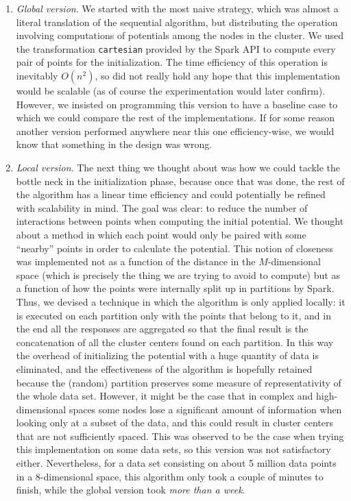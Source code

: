 \begin{enumerate}[1.]
\item \textit{Global version}. We started with the most naive strategy, which was almost a literal translation of the sequential algorithm, but distributing the operation involving computations of potentials among the nodes in the cluster. We used the transformation \verb|cartesian| provided by the Spark API to compute every pair of points for the initialization. The time efficiency of this operation is inevitably $O(n^2)$, so did not really hold any hope that this implementation would be scalable (as of course the experimentation would later confirm). However, we insisted on programming this version to have a baseline case to which we could compare the rest of the implementations. If for some reason another version performed anywhere near this one efficiency-wise, we would know that something in the design was wrong.
\item \textit{Local version}. The next thing we thought about was how we could tackle the bottle neck in the initialization phase, because once that was done, the rest of the algorithm has a linear time efficiency and could potentially be refined with scalability in mind. The goal was clear: to reduce the number of interactions between points when computing the initial potential. We thought about a method in which each point would only be paired with some ``nearby'' points in order to calculate the potential. This notion of closeness was implemented not as a function of the distance in the $M$-dimensional space (which is precisely the thing we are trying to avoid to compute) but as a function of how the points were internally split up in partitions by Spark. Thus, we devised a technique in which the algorithm is only applied locally: it is executed on each partition only with the points that belong to it, and in the end all the responses are aggregated so that the final result is the concatenation of all the cluster centers found on each partition. In this way the overhead of initializing the potential with a huge quantity of data is eliminated, and the effectiveness of the algorithm is hopefully retained because the (random) partition preserves some measure of representativity of the whole data set. However, it might be the case that in complex and high-dimensional spaces some nodes lose a significant amount of information when looking only at a subset of the data, and this could result in cluster centers that are not sufficiently spaced. This was observed to be the case when trying this implementation on some data sets, so this version was not satisfactory either. Nevertheless, for a data set consisting on about 5 million data points in a 8-dimensional space, this algorithm only took a couple of minutes to finish, while the global version took \textit{more than a week}.

\end{enumerate}
